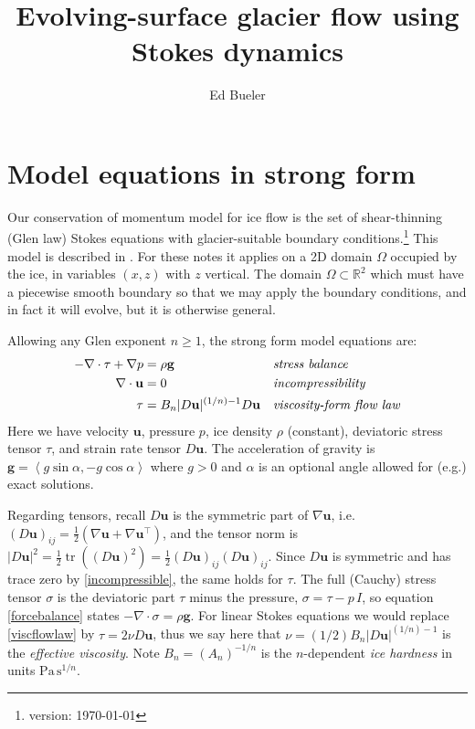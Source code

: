 \documentclass[letterpaper,final,12pt,reqno]{amsart}
\newcommand{\RR}{\mathbb{R}}
\newcommand{\grad}{\nabla}
\newcommand{\Div}{\nabla\cdot}
\newcommand{\trace}{\operatorname{tr}}
\newcommand{\bg}{\mathbf{g}}
\newcommand{\bu}{\mathbf{u}}
\begin{document}
\title{Evolving-surface glacier flow using Stokes dynamics}

\author{Ed Bueler}

\maketitle

\thispagestyle{empty}
\bigskip

\section{Model equations in strong form} \label{sec:strongform}

Our conservation of momentum model for ice flow is the set of shear-thinning (Glen law) Stokes equations with glacier-suitable boundary conditions.\footnote{version: \today}  This model is described in \cite{GreveBlatter2009,JouvetRappaz2011}.  For these notes it applies on a 2D domain $\Omega$ occupied by the ice, in variables $(x,z)$ with $z$ vertical.  The domain $\Omega \subset \RR^2$ which must have a piecewise smooth boundary so that we may apply the boundary conditions, and in fact it will evolve, but it is otherwise general.

Allowing any Glen exponent $n\ge 1$, the strong form model equations are:
\begin{align}
- \nabla \cdot \tau + \nabla p &= \rho \bg &&\text{\emph{stress balance}} \label{forcebalance} \\
\nabla \cdot \bu &= 0 &&\text{\emph{incompressibility}} \label{incompressible} \\
\tau &= B_n |D\bu|^{(1/n) - 1} D\bu  &&\text{\emph{viscosity-form flow law}} \label{viscflowlaw}
\end{align}
Here we have velocity $\bu$, pressure $p$, ice density $\rho$ (constant), deviatoric stress tensor $\tau$, and strain rate tensor $D\bu$.  The acceleration of gravity is $\bg = \left<g\sin\alpha,-g\cos\alpha\right>$ where $g>0$ and $\alpha$ is an optional angle allowed for (e.g.) exact solutions.

Regarding tensors, recall $D\bu$ is the symmetric part of $\grad \bu$, i.e.~$(D\bu)_{ij} = \frac{1}{2} \left(\grad\bu + \grad\bu^\top\right)$, and the tensor norm is $|D\bu|^2 = \frac{1}{2} \trace\left((D\bu)^2\right) = \frac{1}{2} (D\bu)_{ij} (D\bu)_{ij}$.  Since $D\bu$ is symmetric and has trace zero by \eqref{incompressible}, the same holds for $\tau$.  The full (Cauchy) stress tensor $\sigma$ is the deviatoric part $\tau$ minus the pressure, $\sigma = \tau - p\,I$, so equation \eqref{forcebalance} states $-\Div \sigma = \rho \bg$.  For linear Stokes equations we would replace \eqref{viscflowlaw} by $\tau = 2\nu D\bu$, thus we say here that $\nu=(1/2)B_n |D\bu|^{(1/n) - 1}$ is the \emph{effective viscosity}.  Note $B_n = (A_n)^{-1/n}$ is the $n$-dependent \emph{ice hardness} in units $\text{Pa}\,\text{s}^{1/n}$.
\end{document}
